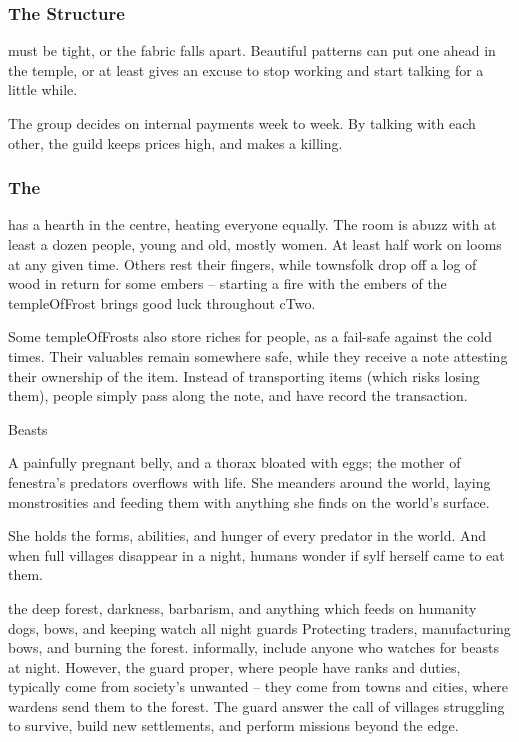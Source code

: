 \begin{multicols}{2}
\subsubsection{The Structure}
must be tight, or the fabric falls apart.
Beautiful patterns can put one ahead in the temple, or at least gives an excuse to stop working and start talking for a little while.

The group decides on internal payments week to week.
By talking with each other, the guild keeps prices high, and makes a killing.

\subsubsection{The }
has a hearth in the centre, heating everyone equally.
The room is abuzz with at least a dozen people, young and old, mostly women.
At least half work on looms at any given time.
Others rest their fingers, while townsfolk drop off a log of wood in return for some embers -- starting a fire with the embers of the \gls{templeOfFrost} brings good luck throughout \gls{cTwo}.


Some \glspl{templeOfFrost} also store riches for people, as a fail-safe against the cold times.
Their valuables remain somewhere safe, while they receive a note attesting their ownership of the item.
Instead of transporting items (which risks losing them), people simply pass along the note, and have  record the transaction.

  {Beasts}%
  {%
    A painfully pregnant belly, and a thorax bloated with eggs; the mother of \gls{fenestra}'s predators overflows with life.
    She meanders around the world, laying monstrosities and feeding them with anything she finds on the world's surface.

    She holds the forms, abilities, and hunger of every predator in the world.
    And when full \glspl{village} disappear in a night, humans wonder if \gls{sylf} herself came to eat them.
  }%
  {the deep forest, darkness, barbarism, and anything which feeds on humanity}%
  {dogs, bows, and keeping watch all night}%
  {\Glspl{guard}}%
  {
    Protecting traders, manufacturing bows, and burning the forest.
  }%
informally, include anyone who watches for beasts at night.
However, the \gls{guard} proper, where people have ranks and duties, typically come from society's unwanted -- they come from towns and cities, where \glspl{warden} send them to the forest.
The \gls{guard} answer the call of \glspl{village} struggling to survive, build new settlements, and perform missions beyond the \gls{edge}.


\end{multicols}

